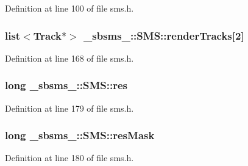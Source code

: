 Definition at line 100 of file sms.\+h.

\subsubsection[{\texorpdfstring{render\+Tracks}{renderTracks}}]{\setlength{\rightskip}{0pt plus 5cm}list$<${\bf Track}$\ast$$>$ \+\_\+sbsms\+\_\+\+::\+S\+M\+S\+::render\+Tracks\mbox{[}2\mbox{]}\hspace{0.3cm}{\ttfamily [protected]}}\hypertarget{class__sbsms___1_1_s_m_s_a57ed3a1ef12c3451aeec26b35c88e234}{}\label{class__sbsms___1_1_s_m_s_a57ed3a1ef12c3451aeec26b35c88e234}


Definition at line 168 of file sms.\+h.

\subsubsection[{\texorpdfstring{res}{res}}]{\setlength{\rightskip}{0pt plus 5cm}long \+\_\+sbsms\+\_\+\+::\+S\+M\+S\+::res\hspace{0.3cm}{\ttfamily [protected]}}\hypertarget{class__sbsms___1_1_s_m_s_a091e988e65c11c86875e6ecdb1efbf91}{}\label{class__sbsms___1_1_s_m_s_a091e988e65c11c86875e6ecdb1efbf91}


Definition at line 179 of file sms.\+h.

\subsubsection[{\texorpdfstring{res\+Mask}{resMask}}]{\setlength{\rightskip}{0pt plus 5cm}long \+\_\+sbsms\+\_\+\+::\+S\+M\+S\+::res\+Mask\hspace{0.3cm}{\ttfamily [protected]}}\hypertarget{class__sbsms___1_1_s_m_s_a970321e0f623109a552c50477adccd16}{}\label{class__sbsms___1_1_s_m_s_a970321e0f623109a552c50477adccd16}


Definition at line 180 of file sms.\+h.


